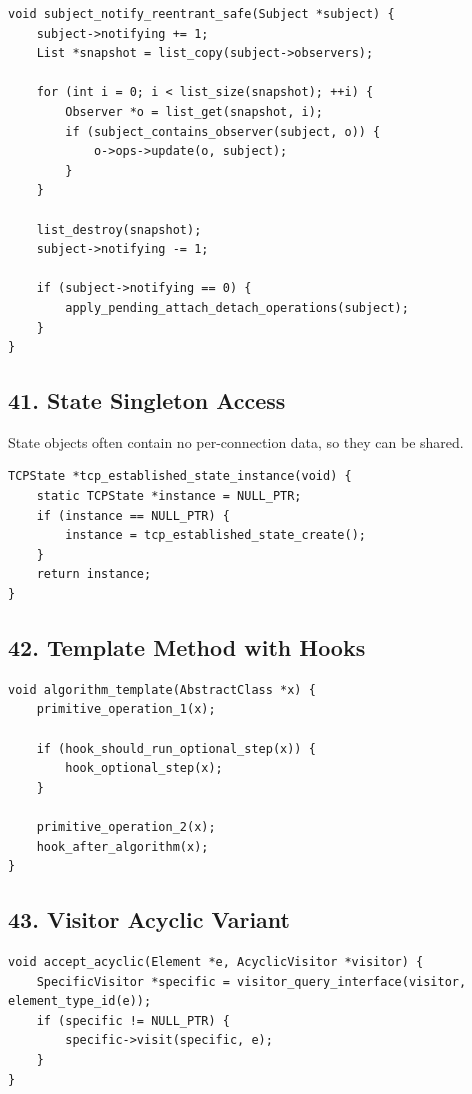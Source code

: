 \documentclass[11pt]{article}
\begin{document}
\begin{verbatim}
void subject_notify_reentrant_safe(Subject *subject) {
    subject->notifying += 1;
    List *snapshot = list_copy(subject->observers);

    for (int i = 0; i < list_size(snapshot); ++i) {
        Observer *o = list_get(snapshot, i);
        if (subject_contains_observer(subject, o)) {
            o->ops->update(o, subject);
        }
    }

    list_destroy(snapshot);
    subject->notifying -= 1;

    if (subject->notifying == 0) {
        apply_pending_attach_detach_operations(subject);
    }
}
\end{verbatim}

\subsection{41. State Singleton Access}\label{state-singleton-access}

State objects often contain no per-connection data, so they can be shared.

\begin{verbatim}
TCPState *tcp_established_state_instance(void) {
    static TCPState *instance = NULL_PTR;
    if (instance == NULL_PTR) {
        instance = tcp_established_state_create();
    }
    return instance;
}
\end{verbatim}

\subsection{42. Template Method with Hooks}\label{template-method-with-hooks}

\begin{verbatim}
void algorithm_template(AbstractClass *x) {
    primitive_operation_1(x);

    if (hook_should_run_optional_step(x)) {
        hook_optional_step(x);
    }

    primitive_operation_2(x);
    hook_after_algorithm(x);
}
\end{verbatim}

\subsection{43. Visitor Acyclic Variant}\label{visitor-acyclic-variant}

\begin{verbatim}
void accept_acyclic(Element *e, AcyclicVisitor *visitor) {
    SpecificVisitor *specific = visitor_query_interface(visitor, element_type_id(e));
    if (specific != NULL_PTR) {
        specific->visit(specific, e);
    }
}
\end{verbatim}
\end{document}
